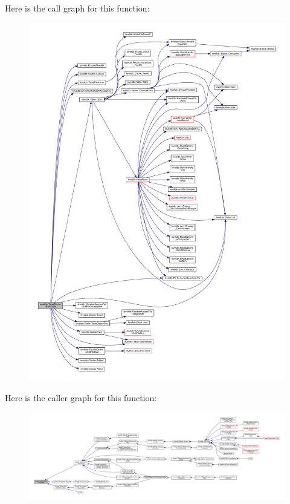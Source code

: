 Here is the call graph for this function\+:\nopagebreak
\begin{figure}[H]
\begin{center}
\leavevmode
\includegraphics[width=350pt]{classleveldb_1_1_table_cache_aa0cd447e821b7d4e39e9e5bb8af96537_cgraph}
\end{center}
\end{figure}




Here is the caller graph for this function\+:
\nopagebreak
\begin{figure}[H]
\begin{center}
\leavevmode
\includegraphics[width=350pt]{classleveldb_1_1_table_cache_aa0cd447e821b7d4e39e9e5bb8af96537_icgraph}
\end{center}
\end{figure}


